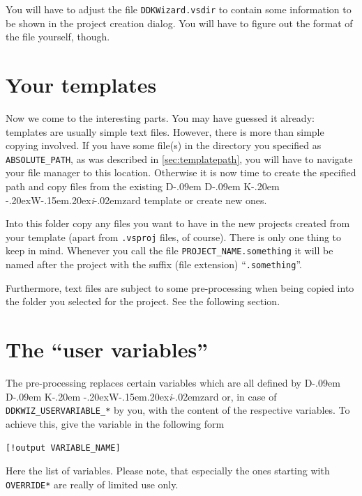 \documentclass[a4paper,titlepage]{report}
\def\ddkwiz{D\kern-.09em D\kern-.09em K\kern-.20em \raise-.20ex\hbox{W}\kern-.15em\raise.20ex\hbox{\it{i}}\kern-.02em{zard}}
\begin{document}
You will have to adjust the file \texttt{DDKWizard.vsdir} to contain
some information to be shown in the project creation dialog. You will have to
figure out the format of the file yourself, though.

\section{Your templates}
Now we come to the interesting parts. You may have guessed it already: templates
are usually simple text files. However, there is more than simple copying involved.
If you have some file(s) in the directory you specified as \verb+ABSOLUTE_PATH+,
as was described in \autoref{sec:templatepath}, you will have to navigate your
file manager to this location. Otherwise it is now time to create the specified
path and copy files from the existing \ddkwiz{} template or create new ones.

Into this folder copy any files you want to have in the new projects
created from your template (apart from \texttt{.vsproj} files, of course).
There is only one thing to keep in mind. Whenever you call the file
\verb+PROJECT_NAME.something+ it will be named after the project with
the suffix (file extension) ``\texttt{.something}''.

Furthermore, text files are subject to some pre-processing when being copied
into the folder you selected for the project. See the following section.

\section{The ``user variables''}
The pre-processing replaces certain variables which are all defined by \ddkwiz{}
or, in case of \verb+DDKWIZ_USERVARIABLE_*+ by you, with the content of the
respective variables. To achieve this, give the variable in the following form

\begin{verbatim}
[!output VARIABLE_NAME]
\end{verbatim}

Here the list of variables. Please note, that especially the ones starting with
\verb+OVERRIDE*+ are really of limited use only.
\end{document}
